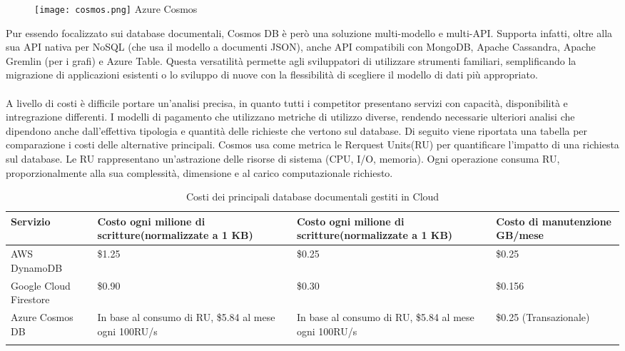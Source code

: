 \begin{wrapfigure}{r}{0.25\textwidth}
    \centering
    \texttt{[image: cosmos.png]}
    Azure Cosmos
\end{wrapfigure}
Pur essendo focalizzato sui database documentali,
Cosmos DB è però una soluzione multi-modello e multi-API.
Supporta infatti, oltre alla sua API nativa per NoSQL (che usa il modello a documenti JSON),
anche API compatibili con MongoDB, Apache Cassandra, Apache Gremlin (per i grafi) e Azure Table.
Questa versatilità permette agli sviluppatori di utilizzare strumenti familiari,
semplificando la migrazione di applicazioni esistenti o
lo sviluppo di nuove con la flessibilità di scegliere il modello di dati più appropriato.\\
\\
A livello di costi è difficile portare un'analisi precisa,
in quanto tutti i competitor presentano servizi
con capacità, disponibilità e intregrazione differenti.
I modelli di pagamento che utilizzano metriche di utilizzo diverse,
rendendo necessarie ulteriori analisi che dipendono anche
dall'effettiva tipologia e quantità delle richieste che vertono sul database.
Di seguito viene riportata una tabella per comparazione i costi delle alternative principali.
Cosmos usa come metrica le Rerquest Units(RU) per quantificare l'impatto di una richiesta sul database.
Le RU rappresentano un'astrazione delle risorse di sistema (CPU, I/O, memoria).
Ogni operazione consuma RU, proporzionalmente alla sua
complessità, dimensione e al carico computazionale richiesto.\\

\begin{longtable}{|P{3.2cm}|P{4.2cm}|P{4.2cm}|P{3cm}|}
    \hline
    \textbf{Servizio}      & \textbf{Costo ogni milione di scritture}\newline(normalizzate a 1 KB) & \textbf{Costo ogni milione di scritture}\newline (normalizzate a 1 KB) & \textbf{Costo di manutenzione GB/mese} \\
    \hline
    AWS DynamoDB           & \$1.25                                                                & \$0.25                                                                 & \$0.25                                 \\
    \hline
    Google Cloud Firestore & \$0.90                                                                & \$0.30                                                                 & \$0.156                                \\
    \hline
    Azure Cosmos DB        & In base al consumo di RU, \$5.84 al mese ogni 100RU/s                 & In base al consumo di RU, \$5.84 al mese ogni 100RU/s                  & \$0.25 (Transazionale)                 \\
    \hline
    \caption{Costi dei principali database documentali gestiti in Cloud}
\end{longtable}

